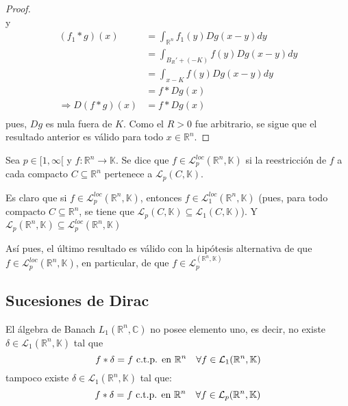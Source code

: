 \documentclass[12pt]{report}
\theoremstyle{largebreak}
\newcommand\cf[3]{\ensuremath{#1:#2\rightarrow#3}}
\begin{document}
\begin{proof}
\begin{equation*}
        \end{equation*}
        y
        \begin{equation*}
            \begin{split}
                (f_1*g)(x)&=\int_{\mathbb{R}^n}f_1(y)Dg(x-y)dy\\
                &=\int_{ B_R'+(-K)}f(y)Dg(x-y)dy\\
                &=\int_{ x-K}f(y)Dg(x-y)dy\\
                &=f*Dg(x)\\
                \Rightarrow D(f*g)(x)&=f*Dg(x)\\
            \end{split}
        \end{equation*}
        pues, $Dg$ es nula fuera de $K$. Como el $R>0$ fue arbitrario, se sigue que el resultado anterior es válido para todo $x\in\mathbb{R}^n$.
    \end{proof}

    \begin{mydef}
        Sea $p\in[1,\infty[$ y $\cf{f}{\mathbb{R}^n}{\mathbb{K}}$. Se dice que $f\in\mathcal{L}_p^{loc}(\mathbb{R}^n,\mathbb{K})$ si la reestricción de $f$ a cada compacto $C\subseteq\mathbb{R}^n$ pertenece a $\mathcal{L}_p(C,\mathbb{K})$.
    \end{mydef}

    \begin{obs}
        Es claro que si $f\in\mathcal{L}_p^{loc}(\mathbb{R}^n,\mathbb{K})$, entonces $f\in \mathcal{L}_1^{loc}(\mathbb{R}^n,\mathbb{K})$ (pues, para todo compacto $C\subseteq\mathbb{R}^n$, se tiene que $\mathcal{L}_p(C,\mathbb{K})\subseteq\mathcal{L}_1(C,\mathbb{K})$). Y $\mathcal{L}_p(\mathbb{R}^n,\mathbb{K})\subseteq\mathcal{L}_p^{loc}(\mathbb{R}^n,\mathbb{K})$

        Así pues, el último resultado es válido con la hipótesis alternativa de que $f\in\mathcal{L}_p^{loc}(\mathbb{R}^n,\mathbb{K})$, en particular, de que $f\in\mathcal{L}_p^(\mathbb{R}^n,\mathbb{K})$
    \end{obs}

    \subsection{Sucesiones de Dirac}

    El álgebra de Banach $L_1(\mathbb{R}^n,\mathbb{C})$ no posee elemento uno, es decir, no existe $\delta\in\mathcal{L}_1(\mathbb{R}^n,\mathbb{K})$ tal que
    \begin{equation*}
        f*\delta=f\textup{ c.t.p. en }\mathbb{R}^n\quad\forall f\in\mathcal{L}_1(\mathbb{R}^n,\mathbb{K})
    \end{equation*}
    tampoco existe $\delta\in\mathcal{L}_1(\mathbb{R}^n,\mathbb{K})$ tal que:
    \begin{equation*}
        f*\delta=f\textup{ c.t.p. en }\mathbb{R}^n\quad\forall f\in\mathcal{L}_p(\mathbb{R}^n,\mathbb{K})
    \end{equation*}
\end{document}

